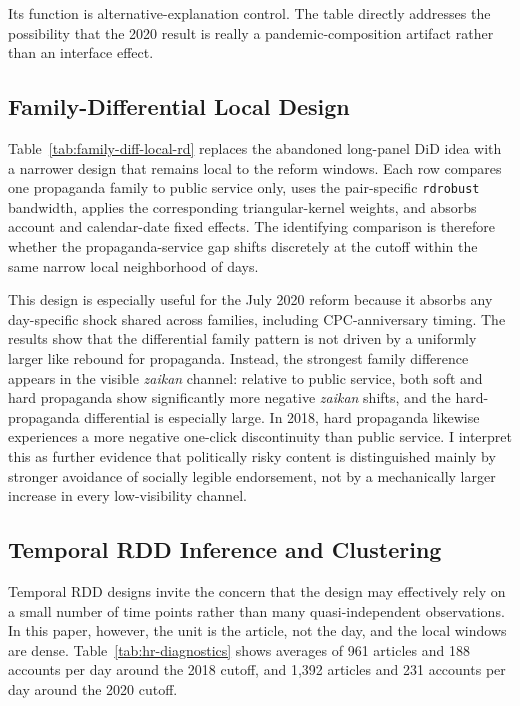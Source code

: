 \documentclass[12pt, american]{article}
\begin{document}
Its function is alternative-explanation control. The table directly addresses the possibility that the 2020 result is really a pandemic-composition artifact rather than an interface effect.



\subsection{Family-Differential Local Design}

Table~\ref{tab:family-diff-local-rd} replaces the abandoned long-panel DiD idea with a narrower design that remains local to the reform windows. Each row compares one propaganda family to public service only, uses the pair-specific \texttt{rdrobust} bandwidth, applies the corresponding triangular-kernel weights, and absorbs account and calendar-date fixed effects. The identifying comparison is therefore whether the propaganda-service gap shifts discretely at the cutoff within the same narrow local neighborhood of days.

This design is especially useful for the July 2020 reform because it absorbs any day-specific shock shared across families, including CPC-anniversary timing. The results show that the differential family pattern is not driven by a uniformly larger like rebound for propaganda. Instead, the strongest family difference appears in the visible \textit{zaikan} channel: relative to public service, both soft and hard propaganda show significantly more negative \textit{zaikan} shifts, and the hard-propaganda differential is especially large. In 2018, hard propaganda likewise experiences a more negative one-click discontinuity than public service. I interpret this as further evidence that politically risky content is distinguished mainly by stronger avoidance of socially legible endorsement, not by a mechanically larger increase in every low-visibility channel.



\subsection{Temporal RDD Inference and Clustering}

Temporal RDD designs invite the concern that the design may effectively rely on a small number of time points rather than many quasi-independent observations. In this paper, however, the unit is the article, not the day, and the local windows are dense. Table~\ref{tab:hr-diagnostics} shows averages of 961 articles and 188 accounts per day around the 2018 cutoff, and 1,392 articles and 231 accounts per day around the 2020 cutoff.
\end{document}
